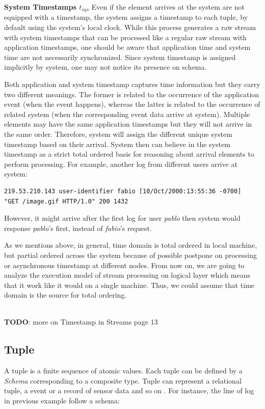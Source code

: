\textbf{System Timestamps $t_{sys}$} Even if the element arrives at the system are not equipped with a timestamp, the system assigns a timestamp to each tuple, by default using the system’s local clock. While this process generates a raw stream with system timestamps that can be processed like a regular raw stream with application timestamps, one should be aware that application time and system time are not necessarily synchronized\citep{Kramer:2009}. Since system timestamp is assigned implicitly by system, one may not notice its presence on schema. 


Both application and system timestamp captures time information but they carry two different meanings. The former is related to the occurrence of the application event (when the event happens), whereas the latter is related to the occurrence of related system (when the corresponding event data arrive at system). Multiple elements may have the same application timestamps but they will not arrive in the same order. Therefore, system will assign the different unique system timestamp based on their arrival. System then can believe in the system timestamp as a strict total ordered basis for reasoning about arrival elements to perform processing. For example, another log from different users arrive at system:
\begin{verbatim}
219.53.210.143 user-identifier fabio [10/Oct/2000:13:55:36 -0700] 
"GET /image.gif HTTP/1.0" 200 1432
\end{verbatim}
However, it might arrive after the first log for user \textit{pablo} then system would response \textit{pablo}'s first, instead of \textit{fabio}'s request.

As we mentions above, in general, time domain is total ordered in local machine, but partial ordered across the system because of possible postpone on processing or asynchronous timestamp at different nodes. From now on, we are going to analyze the execution model of stream processing on logical layer which means that it work like it would on a single machine. Thus, we could assume that time domain is the source for total ordering.

\textbf{\\TODO}: more on Timestamp in Streams \citep{Babcock:2002} page 13

\subsection*{Tuple}
A tuple is a finite sequence of atomic values. Each tuple can be defined by a \textit{Schema} corresponding to a composite type. Tuple can represent a relational tuple, a event or a record of sensor data and so on \citep{Arasu:2006:CCQ}. For instance, the line of log in previous example follow a schema:

